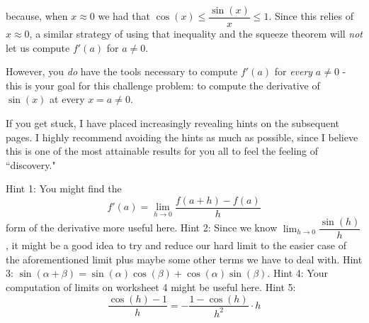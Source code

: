 \documentclass[12pt]{article}
\begin{document}
because, when $x \approx 0$ we had that $\cos(x) \leq \dfrac{\sin(x)}{x} \leq 1$.
Since this relies of $x \approx 0$, a similar strategy of using that inequality 
and the squeeze theorem will \textit{not} let us compute $f'(a)$ for $a \neq 0$.

However, you \textit{do} have the tools necessary to compute $f'(a)$ for \textit{every} $a \neq 0$ - 
this is your goal for this challenge problem: to compute the derivative of $\sin(x)$ at every $x = a \neq 0$.

If you get stuck, I have placed increasingly revealing hints on the subsequent pages. 
I highly recommend avoiding the hints as much as possible, since I believe
this is one of the most attainable results for you all to feel the feeling of ``discovery."

\newpage
Hint 1: You might find the 
\begin{equation}
  f'(a) = \lim_{h \rightarrow 0} \dfrac{f(a + h) - f(a)}{h}
\end{equation}
form of the derivative more useful here.
\newpage
Hint 2: Since we know $\lim_{h \rightarrow 0} \dfrac{\sin(h)}{h}$, it might be a good idea to try and reduce our hard limit
to the easier case of the aforementioned limit plus maybe some other terms we have to deal with.
\newpage
Hint 3: $\sin(\alpha + \beta) = \sin(\alpha) \cos(\beta) + \cos(\alpha) \sin(\beta)$.
\newpage
Hint 4: Your computation of limits on worksheet 4 might be useful here.
\newpage
Hint 5: 
\begin{equation}
  \dfrac{\cos(h) - 1}{h} = -\dfrac{1 - \cos(h)}{h^2} \cdot h
\end{equation}


\end{document}
